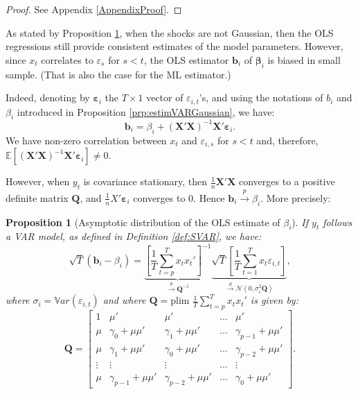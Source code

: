 \documentclass[
  12pt,
]{book}
\newtheorem{proposition}{Proposition}[chapter]
\theoremstyle{definition}
\theoremstyle{definition}
\theoremstyle{definition}
\theoremstyle{definition}
\theoremstyle{remark}
\begin{document}
\begin{proof}
See Appendix \ref{AppendixProof}.
\end{proof}

As stated by Proposition \ref{prp:OLSVAR}, when the shocks are not Gaussian, then the OLS regressions still provide consistent estimates of the model parameters. However, since \(x_t\) correlates to \(\varepsilon_s\) for \(s<t\), the OLS estimator \(\mathbf{b}_i\) of \(\boldsymbol\beta_i\) is biased in small sample. (That is also the case for the ML estimator.)

Indeed, denoting by \(\boldsymbol\varepsilon_i\) the \(T \times 1\) vector of \(\varepsilon_{i,t}\)'s, and using the notations of \(b_i\) and \(\beta_i\) introduced in Proposition \ref{prp:estimVARGaussian}, we have:
\begin{equation}
\mathbf{b}_i = \beta_i + (\mathbf{X}'\mathbf{X})^{-1}\mathbf{X}'\boldsymbol\varepsilon_i.\label{eq:olsar1}
\end{equation}
We have non-zero correlation between \(x_t\) and \(\varepsilon_{i,s}\) for \(s<t\) and, therefore, \(\mathbb{E}[(\mathbf{X}'\mathbf{X})^{-1}\mathbf{X}'\boldsymbol\varepsilon_i] \ne 0\).

However, when \(y_t\) is covariance stationary, then \(\frac{1}{n}\mathbf{X}'\mathbf{X}\) converges to a positive definite matrix \(\mathbf{Q}\), and \(\frac{1}{n}X'\boldsymbol\varepsilon_i\) converges to 0. Hence \(\mathbf{b}_i \overset{p}{\rightarrow} \beta_i\). More precisely:

\begin{proposition}[Asymptotic distribution of the OLS estimate of $\beta_i$]
\protect\hypertarget{prp:OLSVAR}{}\label{prp:OLSVAR}If \(y_t\) follows a VAR model, as defined in Definition \ref{def:SVAR}, we have:
\[
\sqrt{T}(\mathbf{b}_i-\beta_i) =  \underbrace{\left[\frac{1}{T}\sum_{t=p}^T x_t x_t' \right]^{-1}}_{\overset{p}{\rightarrow} \mathbf{Q}^{-1}}
\underbrace{\sqrt{T} \left[\frac{1}{T}\sum_{t=1}^T x_t\varepsilon_{i,t} \right]}_{\overset{d}{\rightarrow} \mathcal{N}(0,\sigma_i^2\mathbf{Q})},
\]
where \(\sigma_i = \mathbb{V}ar(\varepsilon_{i,t})\) and where \(\mathbf{Q} = \mbox{plim }\frac{1}{T}\sum_{t=p}^T x_t x_t'\) is given by:
\begin{equation}
\mathbf{Q} = \left[
\begin{array}{ccccc}
1 & \mu' &\mu' & \dots & \mu' \\
\mu & \gamma_0 + \mu\mu' & \gamma_1 + \mu\mu' & \dots & \gamma_{p-1} + \mu\mu'\\
\mu & \gamma_1 + \mu\mu' & \gamma_0 + \mu\mu' & \dots & \gamma_{p-2} + \mu\mu'\\
\vdots &\vdots &\vdots &\dots &\vdots \\
\mu & \gamma_{p-1} + \mu\mu' & \gamma_{p-2} + \mu\mu' & \dots & \gamma_{0} + \mu\mu'
\end{array}
\right].\label{eq:Qols}
\end{equation}
\end{proposition}
\end{document}
